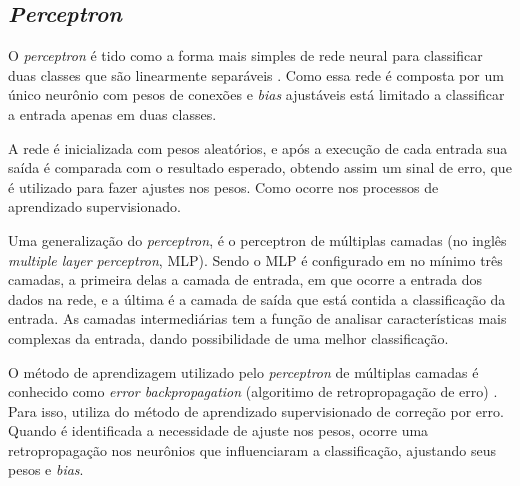 \subsection{\textit{Perceptron}}
O \textit{perceptron} é tido como a forma mais simples de rede neural para classificar duas classes que são linearmente separáveis \cite{haykin2001}. Como essa rede é composta por um único neurônio com pesos de conexões e \textit{bias} ajustáveis está limitado a classificar a entrada apenas em duas classes. 
\par A rede é inicializada com pesos aleatórios, e após a execução de cada entrada sua saída é comparada com o resultado esperado, obtendo assim um sinal de erro, que é utilizado para fazer ajustes nos pesos. Como ocorre nos processos de aprendizado supervisionado.
\par Uma generalização do \textit{perceptron}, é o perceptron de múltiplas camadas (no inglês \textit{multiple layer perceptron}, MLP). Sendo o MLP é configurado em no mínimo três camadas, a primeira delas a camada de entrada, em que ocorre a entrada dos dados na rede, e a última é a camada de saída que está contida a classificação da entrada. As camadas intermediárias tem a função de analisar características mais complexas da entrada, dando possibilidade de uma melhor classificação.
\par O método de aprendizagem utilizado pelo \textit{perceptron} de múltiplas camadas é conhecido como \textit{error backpropagation} (algoritimo de retropropagação de erro) \cite{haykin2001}. Para isso, utiliza do método de aprendizado supervisionado de correção por erro. Quando é identificada a necessidade de ajuste nos pesos, ocorre uma 
retropropagação nos neurônios que influenciaram a classificação, ajustando seus pesos 
e \textit{bias}.
